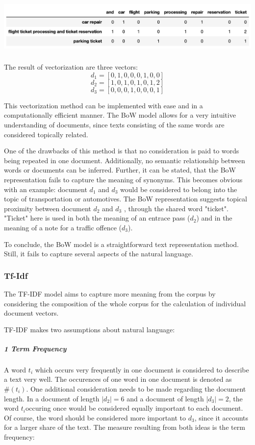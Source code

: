 		\includegraphics[height=2.9cm]{Bilder/bow.png}

		The result of vectorization are three vectors:
		\[ d_{1} = [0,1,0,0,0,1,0,0] \]
		\[ d_{2} = [1,0,1,0,1,0,1,2] \]	
		\[ d_{3} = [0,0,0,1,0,0,0,1]\]


		This vectorization method can be implemented with ease and in a computationally efficient manner. The \ac{BoW} model allows for a very intuitive understanding of documents, since texts consisting of the same words are considered topically related. 
		
		One of the drawbacks of this method is that no consideration is paid to words being repeated in one document. Additionally, no semantic relationship between words or documents can be inferred. 
		Further, it can be stated, that the \ac{BoW} representation fails to capture the meaning of synonyms. This becomes obvious with an example: document $ d_{1} $ and $ d_{3}$ would be considered to belong into the topic of transportation or automotives. The \ac{BoW} representation suggests topical proximity between document $ d_{2} $ and $ d_{3}$ , through the shared word "ticket". "Ticket" here is used in both the meaning of an entrace pass ($d_{2}$) and in the meaning of a note for a traffic offence  ($d_{3}$). 
		
		To conclude, the \ac{BoW} model is a straightforward text representation method. Still, it fails to capture several aspects of the natural language.
		
		\subsubsection{Tf-Idf}
		The \ac{TF-IDF} model aims to capture more meaning from the corpus by considering the composition of the whole corpus for the calculation of individual document vectors.
		
		\ac{TF-IDF} makes two assumptions about natural language:
		
		\subparagraph{1 Term Frequency}
		
		A word $t_{i} $ which occurs very frequently in one document is considered to describe a text very well. The occurences of one word in one document is denoted as $ \#( t_{i}) $.
		One additional consideration needs to be made regarding the document length. In a document of length $ |d_{2}| = 6 $ and a document of length  $ |d_{3}| = 2 $, the word $ t_{i} $occuring once would be considered equally important to each document. Of course, the word should be considered more important to $ d_{3} $, since it accounts for a larger share of the text. The measure resulting from both ideas is the term frequency:
		
